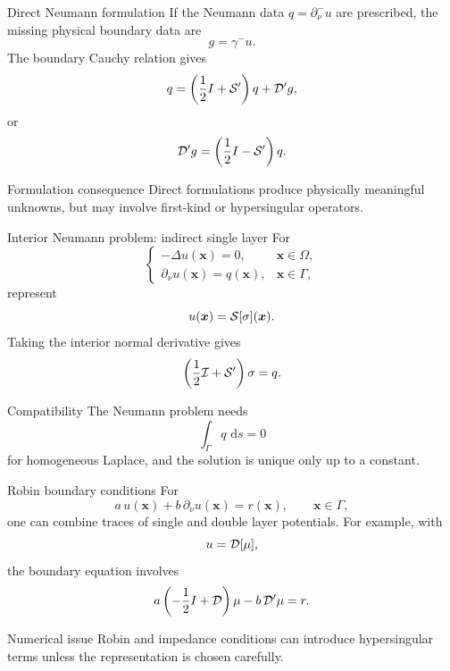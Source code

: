 \documentclass[aspectratio=169,11pt]{beamer}
\newcommand{\dd}{\,\mathrm d}
\newcommand{\x}{\bm{x}}
\begin{document}
\begin{frame}{Direct Neumann formulation}
\small
If the Neumann data $q=\partial_\nu^-u$ are prescribed, the missing physical
boundary data are
\[
g=\gamma^-u.
\]
The boundary Cauchy relation gives
\[
q=
\left(\frac12 I+\mathcal{S}^{\prime}\right)q+\mathcal{D}^{\prime} g,
\]
or
\[
\mathcal{D}^{\prime} g=
\left(\frac12 I-\mathcal{S}^{\prime}\right)q.
\]

\begin{block}{Formulation consequence}
Direct formulations produce physically meaningful unknowns, but may involve
first-kind or hypersingular operators.
\end{block}
\end{frame}

\begin{frame}{Interior Neumann problem: indirect single layer}
\small
For
\[
\begin{cases}
  -\Delta u(\x)=0, & \x\in\Omega,\\
  \partial_\nu u(\x)=q(\x), & \x\in\Gamma,
\end{cases}
\]
represent
\[
  u(\x)=\Sop[\sigma](\x).
\]
Taking the interior normal derivative gives
\[
  \left(\frac12\mathcal{I}+\mathcal{S}^{\prime}\right)\sigma=q.
\]

\begin{block}{Compatibility}
The Neumann problem needs
\[
  \int_\Gamma q\,\dd s=0
\]
for homogeneous Laplace, and the solution is unique only up to a constant.
\end{block}
\end{frame}

\begin{frame}{Robin boundary conditions}
\small
For
\[
a\,u(\x)+b\,\partial_\nu u(\x)=r(\x),
\qquad \x\in\Gamma,
\]
one can combine traces of single and double layer potentials.
For example, with
\[
u=\mathcal{D}[\mu],
\]
the boundary equation involves
\[
a\left(-\frac12 I+\mathcal{D}\right)\mu
-b\,\mathcal{D}^{\prime}\mu=r.
\]

\begin{block}{Numerical issue}
Robin and impedance conditions can introduce hypersingular terms unless the
representation is chosen carefully.
\end{block}
\end{frame}
\end{document}
